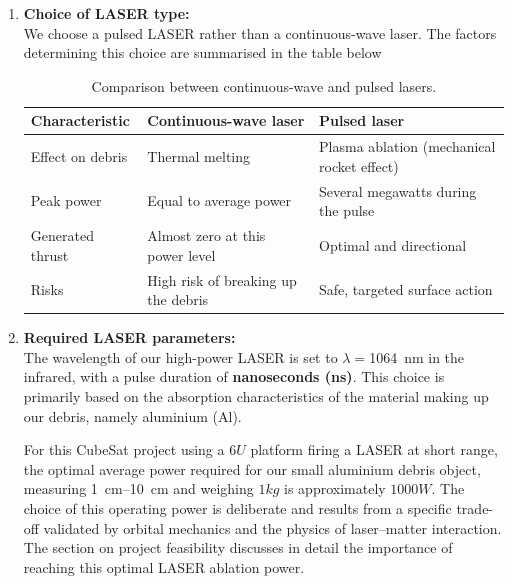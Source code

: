 \begin{enumerate}
    \item \textbf{Choice of LASER type:}\\
    We choose a pulsed LASER rather than a continuous-wave laser. 
    The factors determining this choice are summarised in the table below

    \begin{table}[H]
      \centering
      \caption{Comparison between continuous-wave and pulsed lasers.}
      \begin{tabular}{p{3.5cm} p{5.5cm} p{5.5cm}}
        \toprule
        \textbf{Characteristic} & \textbf{Continuous-wave laser } & \textbf{Pulsed laser} \\
        \midrule
        Effect on debris & Thermal melting  & Plasma ablation (mechanical rocket effect) \\
        Peak power & Equal to average power  & Several megawatts during the pulse \\
        Generated thrust & Almost zero at this power level & Optimal and directional \\
        Risks & High risk of breaking up the debris & Safe, targeted surface action \\
        \bottomrule
      \end{tabular}
    \end{table}

    \item \textbf{Required LASER parameters:}\\
    The wavelength of our high-power LASER is set to $\lambda = $\SI{1064}{\nano\metre} in the infrared, with a pulse duration of \textbf{nanoseconds (ns)}. This choice is primarily based on the absorption characteristics of the material making up our debris, namely aluminium (Al).

    For this CubeSat project using a $6U$ platform firing a LASER at short range, the optimal average power required for our small aluminium debris object, measuring \SIrange{1}{10}{\centi\metre} and weighing $1kg$ is approximately $1000W$. The choice of this operating power is deliberate and results from a specific trade-off validated by orbital mechanics and the physics of laser--matter interaction. The section on project feasibility discusses in detail the importance of reaching this optimal LASER ablation power.


\end{enumerate}
